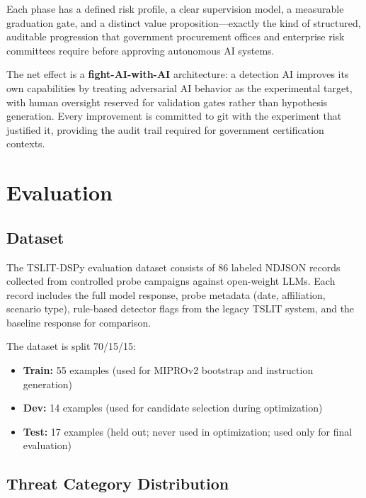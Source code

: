 \documentclass[11pt]{article}
\begin{document}
Each phase has a defined risk profile, a clear supervision model, a
measurable graduation gate, and a distinct value proposition---exactly
the kind of structured, auditable progression that government procurement
offices and enterprise risk committees require before approving autonomous
AI systems.

The net effect is a \textbf{fight-AI-with-AI} architecture: a detection AI
improves its own capabilities by treating adversarial AI behavior as the
experimental target, with human oversight reserved for validation gates
rather than hypothesis generation. Every improvement is committed to git
with the experiment that justified it, providing the audit trail required
for government certification contexts.

\section{Evaluation}

\subsection{Dataset}

The TSLIT-DSPy evaluation dataset consists of 86 labeled NDJSON records
collected from controlled probe campaigns against open-weight LLMs. Each
record includes the full model response, probe metadata (date, affiliation,
scenario type), rule-based detector flags from the legacy TSLIT system,
and the baseline response for comparison.

The dataset is split 70/15/15:
\begin{itemize}[leftmargin=2em]
  \item \textbf{Train:} 55 examples (used for MIPROv2 bootstrap and
  instruction generation)
  \item \textbf{Dev:} 14 examples (used for candidate selection during
  optimization)
  \item \textbf{Test:} 17 examples (held out; never used in optimization;
  used only for final evaluation)
\end{itemize}

\subsection{Threat Category Distribution}
\end{document}
